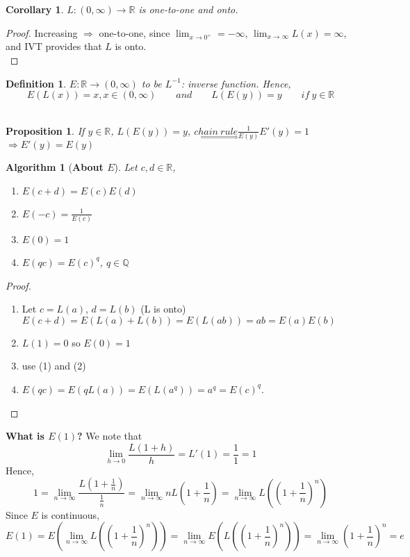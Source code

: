 \documentclass[12pt]{article}
\theoremstyle{plain}
\newtheorem{definition}{Definition}[subsection]
\newtheorem{proposition}{Proposition}[subsection]
\newtheorem{corollary}{Corollary}[subsection]
\newtheorem{algorithm}{Algorithm}[subsection]
\newcommand{\mQ}{{\mathbb{Q}}}
\newcommand{\mR}{{\mathbb{R}}}
\begin{document}
	\begin{corollary}
		$L:(0,\infty) \to \mR$ is one-to-one and onto. 
	\end{corollary}
	\begin{proof}
		Increasing $\Rightarrow$ one-to-one, since $\lim_{x\to 0^+} = -\infty$,
		$\lim_{x\to\infty} L(x) = \infty$, and IVT provides that $L$ is onto.\\
	\end{proof}
	
	\begin{definition}
		$E: \mR \to (0,\infty)$ to be $L^{-1}$: inverse function. Hence,
		\[
			E(L(x)) = x, x\in (0,\infty) \qquad and \qquad 
			L(E(y)) = y \qquad if \ y \in \mR
		\]\\
	\end{definition}
	
	\begin{proposition}
		If $y \in \mR$, $L(E(y)) = y$, 
		$\underset{\Rightarrow}{chain \ rule} \frac1{E(y)} E'(y) = 1$\\
		$\Rightarrow E'(y) = E(y)$\\
	\end{proposition}
	
	\begin{algorithm}[\textbf{About $E$}]
		Let $c,d \in \mR$, 
		\begin{enumerate}
			\item $E(c+d) = E(c) E(d)$
			\item $E(-c) = \frac1{E(c)}$
			\item $E(0)=1$
			\item $E(qc) = E(c)^q$, $q \in \mQ$ 
		\end{enumerate}
	\end{algorithm}
	\begin{proof}
		\begin{enumerate}
			\item Let $c=L(a)$, $d = L(b)$ (L is onto)
				$E(c+d) = E(L(a) + L(b)) = E(L(ab)) = ab = E(a)E(b)$
			\item $L(1) = 0$ so $E(0)=1$
			\item use (1) and (2)
			\item $E(qc) = E(qL(a)) = E(L(a^q)) = a^q = E(c)^q$. 
		\end{enumerate}
		
	\end{proof}

	\textbf{What is $E(1)$?} We note that 
	\[
		\lim_{h\to 0} \frac{L(1+h)}{h} = L'(1) = \frac11=1
	\]
	Hence,
	\[
		1 = \lim_{n\to\infty} \frac{L(1+\frac1n)}{\frac1n} 
		=\lim_{n\to\infty} n L(1+\frac1n) = \lim_{n\to\infty} L((1+\frac1n)^n)
	\]
	Since $E$ is continuous, 
	\[
		E(1) = E(\lim_{n\to\infty}L((1+\frac1n)^n)) = \lim_{n\to\infty}
		E(L((1+\frac1n)^n)) = \lim_{n\to\infty} (1+\frac1n)^n = e
	\]
\end{document}
